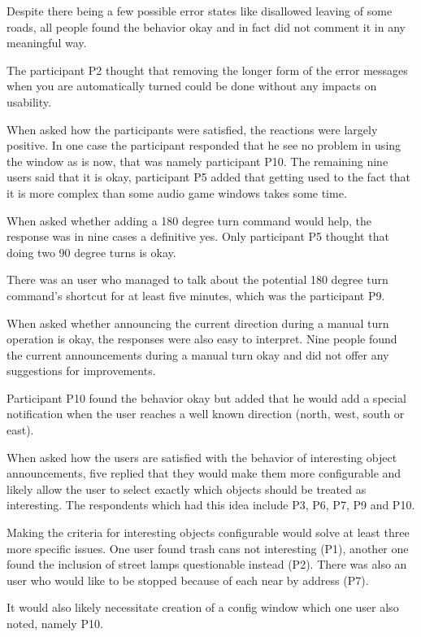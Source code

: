 \documentclass[nolof,digital]{fithesis3}
\begin{document}
Despite there being a few possible error states like disallowed leaving of some roads, all people found the behavior okay and in fact did not comment it in any meaningful way.

The participant P2 thought that removing the longer form of the error messages when you are automatically turned could be done without any impacts on usability.

When asked how the participants were satisfied, the reactions were largely positive. In one case the participant responded that he see no problem in using the window as is now, that was namely participant P10. The remaining nine users said that it is okay, participant P5 added that getting used to the fact that it is more complex than some audio game windows takes some time.

When asked whether adding a 180 degree turn command would help, the response was in nine cases a definitive yes. Only participant P5 thought that doing two 90 degree turns is okay.

There was an user who managed to talk about the potential 180 degree turn command's shortcut for at least five minutes, which was the participant P9.

When asked whether announcing the current direction during a manual turn operation is okay, the responses were also easy to interpret. Nine people found the current announcements during a manual turn okay and did not offer any suggestions for improvements.

Participant P10 found the behavior okay but added that he would add a special notification when the user reaches a well known direction (north, west, south or east).

When asked how the users are satisfied with the behavior of interesting object announcements, five replied that they would make them more configurable and likely allow the user to select exactly which objects should be treated as interesting. The respondents which had this idea include P3, P6, P7, P9 and P10.

Making the criteria for interesting objects configurable would solve at least three more specific issues. One user found trash cans not interesting (P1), another one found the inclusion of street lamps questionable instead (P2). There was also an user who would like to be stopped because of each near by address (P7).

It would also likely necessitate creation of a config window which one user also noted, namely P10.
\end{document}
